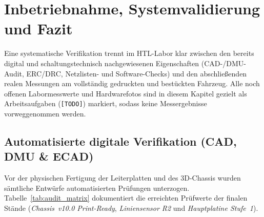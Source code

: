 \chapter{Inbetriebnahme, Systemvalidierung und Fazit}
\label{chap:validierung}

Eine systematische Verifikation trennt im HTL-Labor klar zwischen den bereits digital und schaltungstechnisch nachgewiesenen Eigenschaften (CAD-/DMU-Audit, ERC/DRC, Netzlisten- und Software-Checks) und den abschließenden realen Messungen am vollständig gedruckten und bestückten Fahrzeug. Alle noch offenen Labormesswerte und Hardwarefotos sind in diesem Kapitel gezielt als Arbeitsaufgaben (\texttt{[TODO]}) markiert, sodass keine Messergebnisse vorweggenommen werden.

\section{Automatisierte digitale Verifikation (CAD, DMU \& ECAD)}
\label{sec:digital_audit}
Vor der physischen Fertigung der Leiterplatten und des 3D-Chassis wurden sämtliche Entwürfe automatisierten Prüfungen unterzogen. Tabelle~\ref{tab:audit_matrix} dokumentiert die erreichten Prüfwerte der finalen Stände (\emph{Chassis~v10.0 Print-Ready}, \emph{Liniensensor R2} und \emph{Hauptplatine Stufe~1}).

